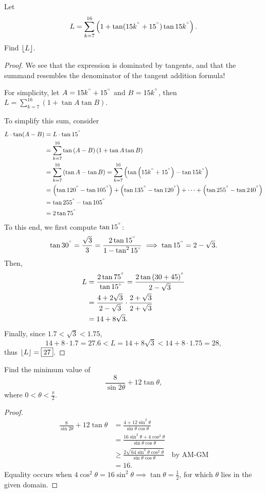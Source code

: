 \documentclass[../jarvis.tex]{subfiles}
\begin{document}
\begin{example}[2018 SMO(S) P17]
    Let 
    $$L=\sum_{k=7}^{16}\left(1+\tan(15k^{^\circ}+15^{^\circ})\tan15k^{^\circ}\right).$$
    Find $\left\lfloor L \right\rfloor$.
\end{example}
\begin{proof}
    We see that the expression is dominated by tangents, and that the summand resembles the denominator of the tangent addition formula!

    For simplicity, let $A=15k^{^\circ}+15^{^\circ}$ and $B=15k^{^\circ}$, then $L=\sum_{k=7}^{16}\left(1+\tan{A}\tan{B}\right).$

    To simplify this sum, consider 
    \begin{align*}
        L\cdot\tan(A-B)&=L\cdot\tan 15^{^\circ}\\
        &=\sum_{k=7}^{16}\tan{(A-B)}\left(1+\tan{A}\tan{B}\right) \\
        &=\sum_{k=7}^{16} \left(\tan{A}-\tan{B}\right)=\sum_{k=7}^{16} \left(\tan{\left(15k^{^\circ}+15^{^\circ}\right)}-\tan{15k^{^\circ}}\right)\\
        &=\left(\tan{120^{^\circ}}-\tan{105^{^\circ}}\right)+\left(\tan{135^{^\circ}}-\tan{120^{^\circ}}\right)+\cdots+\left(\tan{255^{^\circ}}-\tan{240^{^\circ}}\right) \\
        &=\tan{255^{^\circ}}-\tan{105^{^\circ}} \\
        &=2\tan{75^{^\circ}}
    \end{align*}
    To this end, we first compute $\tan{15^{^\circ}}$:
    $$\tan{30^{^\circ}}=\frac{\sqrt{3}}{3}=\frac{2\tan{15^{^\circ}}}{1-\tan^2{15^{^\circ}}} \implies \tan{15^{^\circ}}=2-\sqrt{3}.$$
    Then, 
    \begin{align*}
        L&=\frac{2\tan{75^{^\circ}}}{\tan{15^{^\circ}}}=\frac{2\tan{(30+45)^{^\circ}}}{2-\sqrt{3}} \\
        &=\frac{4+2\sqrt{3}}{2-\sqrt{3}}\cdot\frac{2+\sqrt{3}}{2+\sqrt{3}}\\
        &=14+8\sqrt{3}.
    \end{align*}
    Finally, since $1.7<\sqrt{3}<1.75$,
    $$14+8\cdot1.7=27.6 < L=14+8\sqrt{3} < 14+8\cdot1.75=28,$$
    thus $\left\lfloor L \right\rfloor=\boxed{27}$.
\end{proof}

\begin{example}[2021 SMO(S) P15]
    Find the minimum value of $$\frac{8}{\sin{2\theta}}+12\tan{\theta},$$
    where $0<\theta<\frac{\pi}{2}.$
\end{example}
\begin{proof}
    \begin{align*}
        \frac{8}{\sin{2\theta}}+12\tan{\theta}&=\frac{4+12\sin^2{\theta}}{\sin{\theta}\cos{\theta}} \\
        &=\frac{16\sin^2{\theta}+4\cos^2{\theta}}{\sin{\theta}\cos{\theta}} \\
        &\geq \frac{2\sqrt{64\sin^2{\theta}\cos^2{\theta}}}{\sin{\theta}\cos{\theta}} \quad\text{by AM-GM}\\
        &=\boxed{16}.
    \end{align*}
    Equality occurs when $4\cos^2{\theta}=16\sin^2{\theta} \implies \tan{\theta}=\frac{1}{2}$, for which $\theta$ lies in the given domain.
\end{proof}
\end{document}
